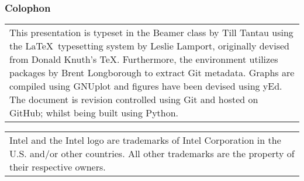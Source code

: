 \begin{frame}[t]

\frametitle{Colophon}

\begin{tabular}{p{\textwidth}}
{\tiny This presentation is typeset in the Beamer class by Till Tantau using the \LaTeX\ typesetting system by Leslie Lamport, originally devised from Donald Knuth's \TeX .
Furthermore, the environment utilizes packages by Brent Longborough to extract Git metadata.
Graphs are compiled using GNUplot and figures have been devised using yEd.
The document is revision controlled using Git and hosted on GitHub; whilst being built using Python.}
\end{tabular}

\begin{tabular}{p{\textwidth}}
{\tiny Intel and the Intel logo are trademarks of Intel Corporation in the U.S. and/or other countries.
All other trademarks are the property of their respective owners.}
\end{tabular}

\end{frame}
